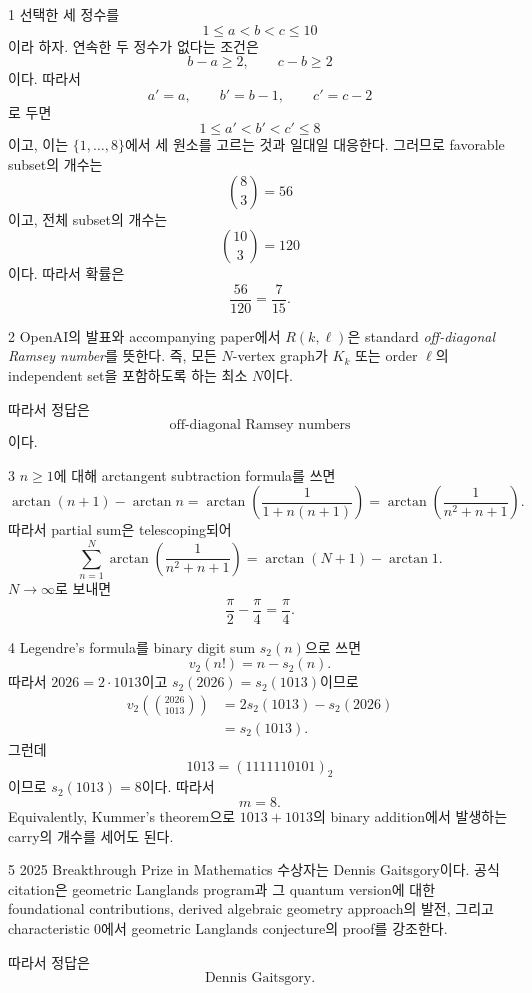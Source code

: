 \documentclass[11pt,oneside]{article}
\begin{document}

\begin{problemsolution}{1}
선택한 세 정수를
\[
    1\leq a<b<c\leq10
\]
이라 하자. 연속한 두 정수가 없다는 조건은
\[
    b-a\geq2,
    \qquad
    c-b\geq2
\]
이다. 따라서
\[
    a'=a,
    \qquad
    b'=b-1,
    \qquad
    c'=c-2
\]
로 두면
\[
    1\leq a'<b'<c'\leq8
\]
이고, 이는 $\{1,\ldots,8\}$에서 세 원소를 고르는 것과 일대일 대응한다. 그러므로 favorable subset의 개수는
\[
    \binom83=56
\]
이고, 전체 subset의 개수는
\[
    \binom{10}{3}=120
\]
이다. 따라서 확률은
\[
    \boxed{\frac{56}{120}=\frac{7}{15}}.
\]
\end{problemsolution}

\begin{problemsolution}{2}
OpenAI의 발표와 accompanying paper에서 $R(k,\ell)$은 standard \emph{off-diagonal Ramsey number}를 뜻한다. 즉, 모든 $N$-vertex graph가 $K_k$ 또는 order $\ell$의 independent set을 포함하도록 하는 최소 $N$이다.

따라서 정답은
\[
    \boxed{\text{off-diagonal Ramsey numbers}}
\]
이다.
\end{problemsolution}

\begin{problemsolution}{3}
$n\geq1$에 대해 arctangent subtraction formula를 쓰면
\[
    \arctan(n+1)-\arctan n
    =
    \arctan\!\left(
        \frac{1}{1+n(n+1)}
    \right)
    =
    \arctan\!\left(\frac{1}{n^2+n+1}\right).
\]
따라서 partial sum은 telescoping되어
\[
    \sum_{n=1}^{N}
    \arctan\!\left(\frac{1}{n^2+n+1}\right)
    =
    \arctan(N+1)-\arctan1.
\]
$N\to\infty$로 보내면
\[
    \boxed{\frac{\pi}{2}-\frac{\pi}{4}=\frac{\pi}{4}}.
\]
\end{problemsolution}

\begin{problemsolution}{4}
Legendre's formula를 binary digit sum $s_2(n)$으로 쓰면
\[
    v_2(n!)=n-s_2(n).
\]
따라서 $2026=2\cdot1013$이고 $s_2(2026)=s_2(1013)$이므로
\[
    \begin{aligned}
    v_2\!\left(\binom{2026}{1013}\right)
    &=
    2s_2(1013)-s_2(2026)\\
    &=s_2(1013).
    \end{aligned}
\]
그런데
\[
    1013=(1111110101)_2
\]
이므로 $s_2(1013)=8$이다. 따라서
\[
    \boxed{m=8}.
\]
Equivalently, Kummer's theorem으로 $1013+1013$의 binary addition에서 발생하는 carry의 개수를 세어도 된다.
\end{problemsolution}

\begin{problemsolution}{5}
2025 Breakthrough Prize in Mathematics 수상자는 Dennis Gaitsgory이다. 공식 citation은 geometric Langlands program과 그 quantum version에 대한 foundational contributions, derived algebraic geometry approach의 발전, 그리고 characteristic $0$에서 geometric Langlands conjecture의 proof를 강조한다.

따라서 정답은
\[
    \boxed{\text{Dennis Gaitsgory}}.
\]
\end{problemsolution}
\end{document}
